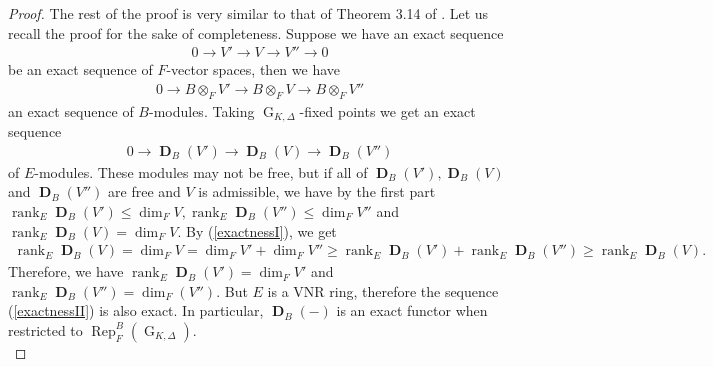 \documentclass{amsart}
\DeclareMathOperator{\rank}{rank}
\DeclareMathOperator{\G}{G}
\DeclareMathOperator{\Rep}{Rep}
\DeclareMathOperator{\bD}{\textbf{D}}
\begin{document}
\begin{proof}
   The rest of the proof is very similar to that of Theorem 3.14 of \cite{Fontaine}. Let us recall the proof for the sake of completeness. Suppose we have an exact sequence
   \begin{align}\label{exactnessI}
       0\to V'\to V\to V''\to 0
   \end{align}
   be an exact sequence of $F$-vector spaces, then we have
   \begin{align*}
       0\to B\otimes_F V'\to B\otimes_F V\to B\otimes_F V''
   \end{align*}
   an exact sequence of $B$-modules. Taking $\G_{K,\Delta}$-fixed points we get an exact sequence
   \begin{align}\label{exactnessII}
       0\to \bD_B(V')\to \bD_B(V)\to \bD_B(V'')
   \end{align}
   of $E$-modules. These modules may not be free, but if all of $\bD_B(V'),\bD_B(V)$ and $\bD_B(V'')$ are free and $V$ is admissible, we have by the first part $\rank_E\bD_B(V')\leq \dim_FV, \rank_E\bD_B(V'')\leq\dim_FV''$ and $\rank_E\bD_B(V)=\dim_F V$. By (\ref{exactnessI}), we get 
   \begin{align*}
       \rank_E\bD_B(V)=\dim_FV=\dim_FV'+\dim_FV''\geq \rank_E\bD_B(V')+\rank_E\bD_B(V'')\geq \rank_E\bD_B(V).
   \end{align*}
   Therefore, we have $\rank_E\bD_B(V')=\dim_FV'$ and $\rank_E\bD_B(V'')=\dim_F(V'')$. But $E$ is a VNR ring, therefore the sequence (\ref{exactnessII}) is also exact. In particular, $\bD_B(-)$ is an exact functor when restricted to $\Rep^B_F(\G_{K,\Delta})$.\\


\end{proof}
\end{document}
